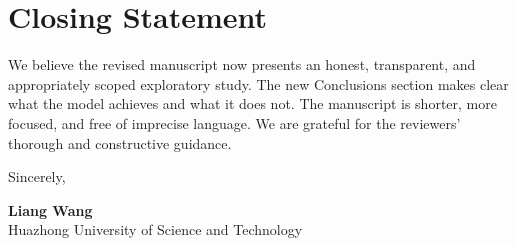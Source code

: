 \documentclass[11pt]{article}
\begin{document}
\section*{Closing Statement}

We believe the revised manuscript now presents an honest, transparent, and appropriately scoped exploratory study. The new Conclusions section makes clear what the model achieves and what it does not. The manuscript is shorter, more focused, and free of imprecise language. We are grateful for the reviewers' thorough and constructive guidance.

\vspace{0.5cm}
\noindent Sincerely,

\noindent \textbf{Liang Wang}\\
Huazhong University of Science and Technology
\end{document}
